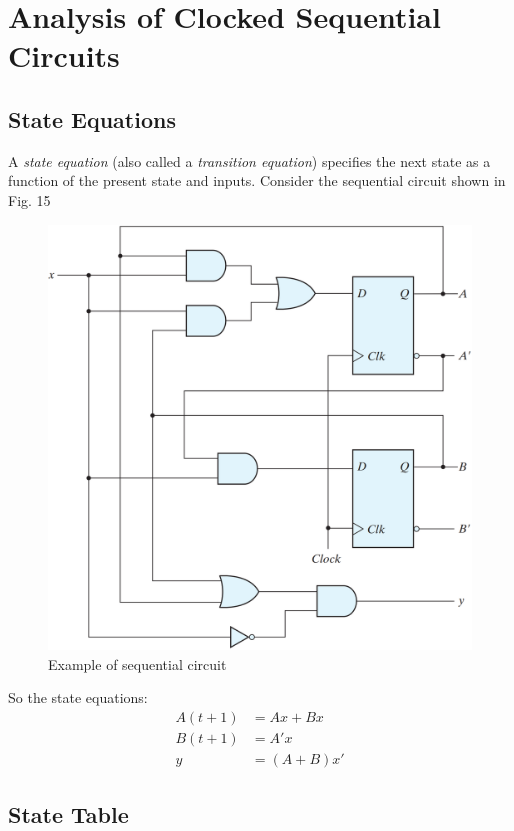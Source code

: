 \section{Analysis of Clocked Sequential Circuits}
\label{sec:analysis-clocked-seq-circ}

\subsection{State Equations}
\label{subsec:state-equations}

A \textit{state equation} (also called a \textit{transition equation}) specifies the next state as a function of the present state and inputs. Consider the sequential circuit shown in Fig. 15
\begin{figure}[H]
  \centering
  \includegraphics[width=\linewidth]{img/fig-5.15.png}
  \caption{Example of sequential circuit}
  \label{fig:5.15}
\end{figure}
\noindent So the state equations:
\begin{align*}
  A(t + 1) &= Ax + Bx\\
  B(t + 1) &= A'x\\
  y &= (A + B)x'
\end{align*}

\subsection{State Table}
\label{subsec:state-table}

